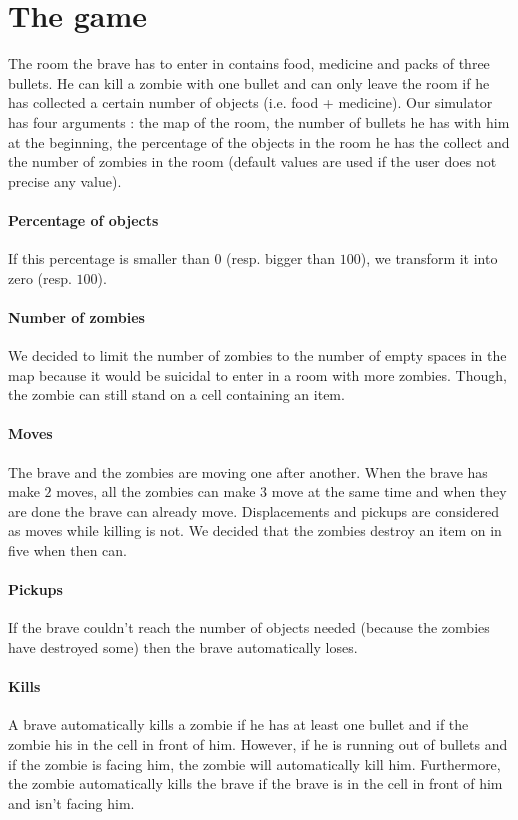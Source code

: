 \documentclass[11pt,a4paper]{article}
\begin{document}
\section*{The game}

The room the brave has to enter in contains food, medicine and packs of three bullets. He can kill a zombie with one bullet and can only leave the room if he has collected a certain number of objects (i.e. food + medicine). Our simulator has four arguments : the map of the room, the number of bullets he has with him at the beginning, the percentage of the objects in the room he has the collect and the number of zombies in the room (default values are used if the user does not precise any value).

\paragraph{Percentage of objects} If this percentage is smaller than 0 (resp. bigger than $100$), we transform it into zero (resp. $100$).

\paragraph{Number of zombies} We decided to limit the number of zombies to the number of empty spaces in the map because it would be suicidal to enter in a room with more zombies. Though, the zombie can still stand on a cell containing an item. 

\paragraph{Moves} The brave and the zombies are moving one after another. When the brave has make $2$ moves, all the zombies can make $3$ move at the same time and when they are done the brave can already move. Displacements and pickups are considered as moves while killing is not. We decided that the zombies destroy an item on in five when then can. 

\paragraph{Pickups} If the brave couldn't reach the number of objects needed (because the zombies have destroyed some) then the brave automatically loses. 

\paragraph{Kills} A brave automatically kills a zombie if he has at least one bullet and if the zombie his in the cell in front of him. However, if he is running out of bullets and if the zombie is facing him, the zombie will automatically kill him. Furthermore, the zombie automatically kills the brave if the brave is in the cell in front of him and isn't facing him.
\end{document}
